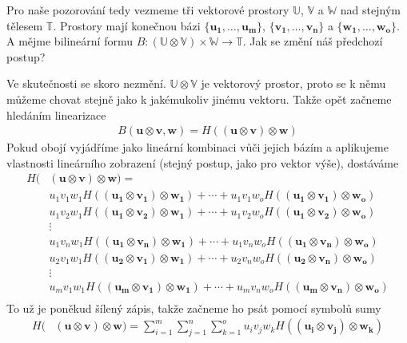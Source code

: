 \documentclass[a5paper,12pt]{amsbook}
\theoremstyle{definition}
\newcommand{\myvec}[1]{\bm{#1}}
\newcommand{\myspace}[1]{\mathbb{#1}}
\begin{document}
Pro naše pozorování tedy vezmeme tři vektorové prostory $\myspace{U}$, $\myspace{V}$ a $\myspace{W}$
nad stejným tělesem $\myspace{T}$. Prostory mají konečnou bázi $\{\myvec{u_1}, \hdots, \myvec{u_m}\}$,
$\{\myvec{v_1}, \hdots, \myvec{v_n}\}$ a $\{\myvec{w_1}, \hdots, \myvec{w_o}\}$. A mějme bilineární
formu $B: (\myspace{U}\otimes\myspace{V})\times\myspace{W}\rightarrow\myspace{T}$. Jak se změní
náš předchozí postup?

Ve skutečnosti se skoro nezmění. $\myspace{U}\otimes\myspace{V}$ je vektorový prostor, proto se k němu
můžeme chovat stejně jako k jakémukoliv jinému vektoru. Takže opět začneme hledáním linearizace
\begin{equation*}
\begin{split}
B(\myvec{u}\otimes\myvec{v}, \myvec{w}) = H((\myvec{u}\otimes\myvec{v})\otimes\myvec{w})
\end{split}
\end{equation*}
Pokud obojí vyjádříme jako lineární kombinaci vůči jejich bázím a aplikujeme vlastnosti lineárního
zobrazení (stejný postup, jako pro vektor výše), dostáváme
\begin{equation*}
\begin{split}
H(&(\myvec{u}\otimes\myvec{v})\otimes\myvec{w}) = \\
  &u_1 v_1 w_1 H((\myvec{u_1}\otimes\myvec{v_1})\otimes\myvec{w_1})
  + \cdots + u_1 v_1 w_o H((\myvec{u_1}\otimes\myvec{v_1})\otimes\myvec{w_o}) \\
  &u_1 v_2 w_1 H((\myvec{u_1}\otimes\myvec{v_2})\otimes\myvec{w_1})
  + \cdots + u_1 v_2 w_o H((\myvec{u_1}\otimes\myvec{v_2})\otimes\myvec{w_o}) \\
  &\vdots \\
  &u_1 v_n w_1 H((\myvec{u_1}\otimes\myvec{v_n})\otimes\myvec{w_1})
  + \cdots + u_1 v_n w_o H((\myvec{u_1}\otimes\myvec{v_n})\otimes\myvec{w_o}) \\
  &u_2 v_1 w_1 H((\myvec{u_2}\otimes\myvec{v_1})\otimes\myvec{w_1})
  + \cdots + u_2 v_n w_o H((\myvec{u_2}\otimes\myvec{v_n})\otimes\myvec{w_o}) \\
  &\vdots \\
  &u_m v_1 w_1 H((\myvec{u_m}\otimes\myvec{v_1})\otimes\myvec{w_1})
  + \cdots + u_m v_n w_o H((\myvec{u_m}\otimes\myvec{v_n})\otimes\myvec{w_o}) \\
\end{split}
\end{equation*}
To už je poněkud šílený zápis, takže začneme ho psát pomocí symbolů sumy
\begin{equation*}
\begin{split}
H(&(\myvec{u}\otimes\myvec{v})\otimes\myvec{w}) =
  \sum_{i=1}^{m}\sum_{j=1}^{n}\sum_{k=1}^{o}u_i v_j w_k H((\myvec{u_i}\otimes\myvec{v_j})\otimes\myvec{w_k})
\end{split}
\end{equation*}
\end{document}
